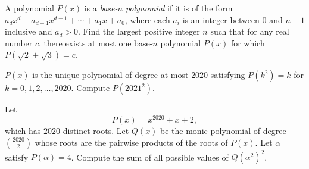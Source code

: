 \documentclass[11pt]{article}
\theoremstyle{definition}
\begin{document}
%	




\begin{question}[name={2020 HMMT, Algebra \& Number Theory, \href{https://artofproblemsolving.com/community/c4p14065063}{Problem 6}}]
	A polynomial $P(x)$ is a \emph{base-$n$ polynomial} if it is of the form $a_dx^d+a_{d-1}x^{d-1}+\cdots + a_1x+a_0$, where each $a_i$ is an integer between $0$ and $n-1$ inclusive and $a_d>0$. Find the largest positive integer $n$ such that for any real number $c$, there exists at most one base-$n$ polynomial $P(x)$ for which $P(\sqrt 2+\sqrt 3)=c$.
\end{question}



%	




\begin{question}[name={2020 HMMT, Algebra \& Number Theory, \href{https://artofproblemsolving.com/community/c4p14065077}{Problem 8}}]
	$P(x)$ is the unique polynomial of degree at most $2020$ satisfying $P(k^2)=k$ for $k=0,1,2,\dots,2020$. Compute $P(2021^2)$.
\end{question}



%	





\begin{question}[name={2020 HMMT, Algebra \& Number Theory, \href{https://artofproblemsolving.com/community/c4p14065082}{Problem 9}}]
	Let $$P(x)=x^{2020}+x+2,$$ which has $2020$ distinct roots. Let $Q(x)$ be the monic polynomial of degree $\binom{2020}{2}$ whose roots are the pairwise products of the roots of $P(x)$. Let $\alpha$ satisfy $P(\alpha)=4$. Compute the sum of all possible values of $Q(\alpha^2)^2$.
\end{question}



%	
\end{document}
